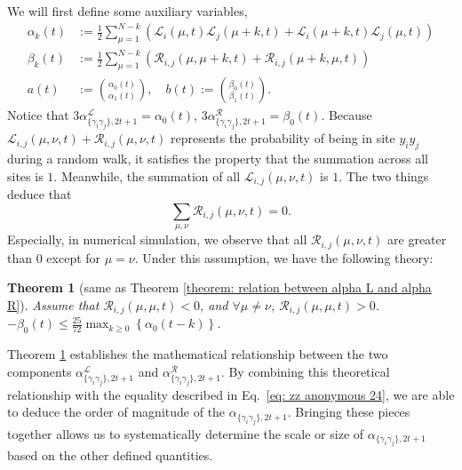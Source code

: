 \documentclass{article}
\newtheorem{theorem}{Theorem}
\newcommand{\alpl}{\alpha_{\{\gamma_i\gamma_j\}, 2t+1}^{\mathscr{L}}}
\newcommand{\alpr}{\alpha_{\{\gamma_i\gamma_j\}, 2t+1}^{\mathscr{R}}}
\begin{document}
We will first define some auxiliary variables, 
\begin{align*}
\alpha_k(t) & :=\frac{1}{2} \sum_{\mu=1}^{N-k}\left(\mathcal{L}_i(\mu, t) \mathcal{L}_j(\mu+k, t)+\mathcal{L}_i(\mu+k, t) \mathcal{L}_j(\mu, t)\right) \\
\beta_k(t) & :=\frac{1}{2} \sum_{\mu=1}^{N-k}\left(\mathscr{R}_{i, j}(\mu, \mu+k, t)+\mathscr{R}_{i, j}(\mu+k, \mu, t)\right) \\
a(t) & :=\binom{\alpha_0(t)}{\alpha_1(t)}, \quad b(t):=\binom{\beta_0(t)}{\beta_1(t)}.
\end{align*}
Notice that $3\alpl = \alpha_0(t)$, $3\alpr = \beta_0(t)$. Because $\mathscr{L}_{i, j}(\mu, \nu, t) + \mathscr{R}_{i, j}(\mu, \nu, t)$ represents the probability of being in site $y_iy_j$ during a random walk, it satisfies the property that the summation across all sites is $1$. Meanwhile, the summation of all $\mathscr{L}_{i, j}(\mu, \nu, t)$ is $1$. The two things deduce that
\begin{equation}
    \sum_{\mu, \nu} \mathscr{R}_{i, j}(\mu, \nu, t) =0.
\end{equation}
Especially, in numerical simulation, we observe that all $\mathscr{R}_{i, j}(\mu, \nu, t)$ are greater than $0$ except for $\mu=\nu$. Under this assumption, we have the following theory:
\begin{theorem}[same as Theorem \ref{theorem: relation between alpha L and alpha R}]
\label{theorem: relation between alpha L and alpha R 2}
    Assume that $\mathscr{R}_{i, j}(\mu, \mu, t)<0$, and $\forall \mu \neq \nu$, $\mathscr{R}_{i, j}(\mu, \mu, t)>0$. $-\beta_0(t) \leq \frac{25}{72} \max_{k \geq 0}\left\{\alpha_0(t-k)\right\}$.
\end{theorem}
Theorem \ref{theorem: relation between alpha L and alpha R 2} establishes the mathematical relationship between the two components $\alpl$ and $\alpr$. By combining this theoretical relationship with the equality described in Eq.~\eqref{eq: zz anonymous 24}, we are able to deduce the order of magnitude of the $\alpha_{\{\gamma_i\gamma_j\}, 2t+1}$. Bringing these pieces together allows us to systematically determine the scale or size of $\alpha_{\{\gamma_i\gamma_j\}, 2t+1}$ based on the other defined quantities. 
\end{document}
